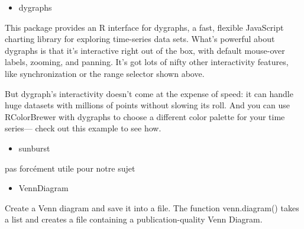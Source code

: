 \documentclass[
]{report}
\providecommand{\tightlist}{%
  \setlength{\itemsep}{0pt}\setlength{\parskip}{0pt}}
\begin{document}
\begin{itemize}
\tightlist
\item
  dygraphs
\end{itemize}

This package provides an R interface for dygraphs, a fast, flexible JavaScript charting library for exploring time-series data sets. What's powerful about dygraphs is that it's interactive right out of the box, with default mouse-over labels, zooming, and panning. It's got lots of nifty other interactivity features, like synchronization or the range selector shown above.

But dygraph's interactivity doesn't come at the expense of speed: it can handle huge datasets with millions of points without slowing its roll. And you can use RColorBrewer with dygraphs to choose a different color palette for your time series--- check out this example to see how.

\begin{itemize}
\tightlist
\item
  sunburst
\end{itemize}

pas forcément utile pour notre sujet

\begin{itemize}
\tightlist
\item
  VennDiagram
\end{itemize}

Create a Venn diagram and save it into a file. The function venn.diagram() takes a list and creates a file containing a publication-quality Venn Diagram.

  
\end{document}
